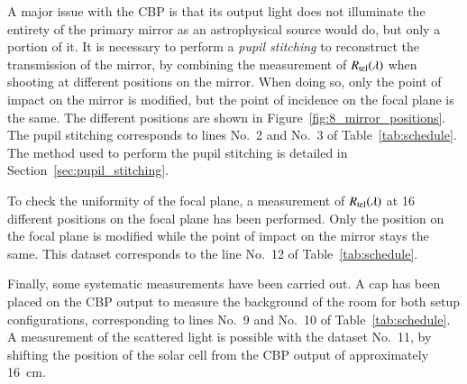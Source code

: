 A major issue with the CBP is that its output light does not illuminate the entirety of the \SD primary mirror as an astrophysical source would do, but only a portion of it. It is necessary to perform a \textit{pupil stitching} to reconstruct the transmission of the mirror, by combining the measurement of $R_{\mathrm{tel}}(\lambda)$ when shooting at different positions on the mirror. When doing so, only the point of impact on the mirror is modified, but the point of incidence on the focal plane is the same. The different positions are shown in Figure~\ref{fig:8_mirror_positions}. The pupil stitching corresponds to lines No.~2 and No.~3 of Table~\ref{tab:schedule}. The method used to perform the pupil stitching is detailed in Section~\ref{sec:pupil_stitching}.

To check the uniformity of the \SD focal plane, a measurement of $R_{\mathrm{tel}}(\lambda)$ at 16 different positions on the focal plane has been performed. Only the position on the focal plane is modified while the point of impact on the mirror stays the same. This dataset corresponds to the line No.~12 of Table~\ref{tab:schedule}. 

Finally, some systematic measurements have been carried out. A cap has been placed on the CBP output to measure the background of the room for both setup configurations, corresponding to lines No.~9 and No.~10 of Table~\ref{tab:schedule}. A measurement of the scattered light is possible with the dataset No.~11, by shifting the position of the solar cell from the CBP output of approximately \SI{16}{\centi\meter}.


